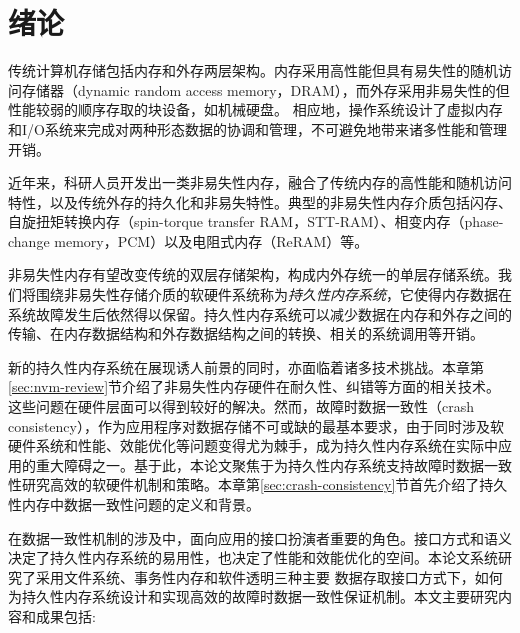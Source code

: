 \chapter{绪论}
\label{chap:intro}

传统计算机存储包括内存和外存两层架构。内存采用高性能但具有易失性的随机访问存储器（dynamic random access memory，DRAM），而外存采用非易失性的但性能较弱的顺序存取的块设备，如机械硬盘。
相应地，操作系统设计了虚拟内存和I/O系统\cite{Galvin:2013:OSC:2531466,Tanenbaum:2014:MOS:2655363}来完成对两种形态数据的协调和管理，不可避免地带来诸多性能和管理开销\cite{Lang:1977:DBP:320576.320585,Yu:2014:OBI:2642648.2619092}。

近年来，科研人员开发出一类非易失性内存，融合了传统内存的高性能和随机访问特性，以及传统外存的持久化和非易失特性。典型的非易失性内存介质包括闪存\cite{705361,542301}、自旋扭矩转换内存（spin-torque transfer RAM，STT-RAM）\cite{4443191,6557176}、相变内存（phase-change memory，PCM）\cite{Loke22062012,6176872,Raoux:2008:PRA,10.1109/MM.2010.24}以及电阻式内存（ReRAM）\cite{5607274}等。

非易失性内存有望改变传统的双层存储架构，构成内外存统一的单层存储系统。我们将围绕非易失性存储介质的软硬件系统称为\emph{持久性内存系统}，它使得内存数据在系统故障发生后依然得以保留。持久性内存系统可以减少数据在内存和外存之间的传输、在内存数据结构和外存数据结构之间的转换、相关的系统调用等开销\cite{meza2013case}。

新的持久性内存系统在展现诱人前景的同时，亦面临着诸多技术挑战。本章第\ref{sec:nvm-review}节介绍了非易失性内存硬件在耐久性、纠错等方面的相关技术。这些问题在硬件层面可以得到较好的解决。然而，故障时数据一致性（crash consistency），作为应用程序对数据存储不可或缺的最基本要求，由于同时涉及软硬件系统和性能、效能优化等问题变得尤为棘手，成为持久性内存系统在实际中应用的重大障碍之一\cite{Onur:2014:RPO}。基于此，本论文聚焦于为持久性内存系统支持故障时数据一致性研究高效的软硬件机制和策略。本章第\ref{sec:crash-consistency}节首先介绍了持久性内存中数据一致性问题的定义和背景。

在数据一致性机制的涉及中，面向应用的接口扮演者重要的角色。接口方式和语义决定了持久性内存系统的易用性，也决定了性能和效能优化的空间。本论文系统研究了采用文件系统、事务性内存和软件透明三种主要
数据存取接口方式下，如何为持久性内存系统设计和实现高效的故障时数据一致性保证机制。本文主要研究内容和成果包括:

